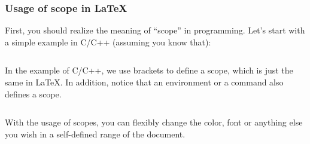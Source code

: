 \begin{frame}[fragile]
	\frametitle{Usage of scope in \LaTeX}
	First, you should realize the meaning of ``scope'' in programming. Let's start with a simple example in C/C++ (assuming you know that):
	\inputminted{c++}{../examples/scope.cpp}
\end{frame}

\begin{frame}[fragile]
	In the example of C/C++, we use brackets \structure{\{\}} to define a scope, which is just the same in \LaTeX. In addition, notice that an environment or a command also defines a scope.

	\begin{example}
	\begin{multicols}{2}
		\inputminted{latex}{../examples/scope.tex}
		\columnbreak
		
	\end{multicols}
	\end{example}

	With the usage of scopes, you can flexibly change the color, font or anything else you wish in a self-defined range of the document.

\end{frame}
